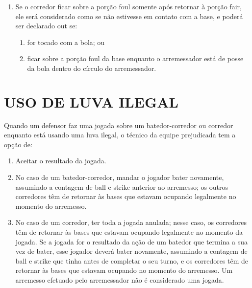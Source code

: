 \begin{multicols}{2}
\begin{enumerate}[label=\alph*)]
\begin{enumerate}[label=\roman*)]
			\item Se o corredor ficar sobre a por\c{c}\~ao \gls{foul} somente ap\'os retornar \`a por\c{c}\~ao \gls{fair}, ele ser\'a considerado como se n\~ao estivesse em contato com a base, e poder\'a ser declarado \gls{out} se: 
			\begin{enumerate}[label=\arabic*)]
				\item for tocado com a bola; ou 
				\item ficar sobre a por\c{c}\~ao \gls{foul} da base enquanto o arremessador est\'a de posse da bola dentro do c\'irculo do arremessador. 
			\end{enumerate}	
		\end{enumerate}
	\end{enumerate}
\end{multicols}

\section{USO DE LUVA ILEGAL}
\begin{multicols}{2}
	Quando um defensor faz uma jogada sobre um batedor-corredor ou corredor enquanto est\'a usando uma luva ilegal, o t\'ecnico da equipe prejudicada tem a op\c{c}\~ao de: 
	
	\begin{enumerate}[label=\alph*)]
		\item Aceitar o resultado da jogada. 
		
		\item No caso de um batedor-corredor, mandar o jogador bater novamente, assumindo a contagem de \gls{ball} e \gls{strike} anterior ao arremesso; os outros corredores t\^em de retornar \`as bases que estavam ocupando legalmente no momento do arremesso. 
		\item No caso de um corredor, ter toda a jogada anulada; nesse caso, os corredores t\^em de retornar \`as bases que estavam ocupando legalmente no momento da jogada. Se a jogada for o resultado da a\c{c}\~ao de um batedor que termina a sua vez de bater, esse jogador dever\'a bater novamente, assumindo a contagem de \gls{ball} e \gls{strike} que tinha antes de completar o seu turno, e os corredores t\^em de retornar \`as bases que estavam ocupando no momento do arremesso. Um arremesso efetuado pelo arremessador n\~ao \'e considerado uma jogada. 
	\end{enumerate}
\end{multicols}

